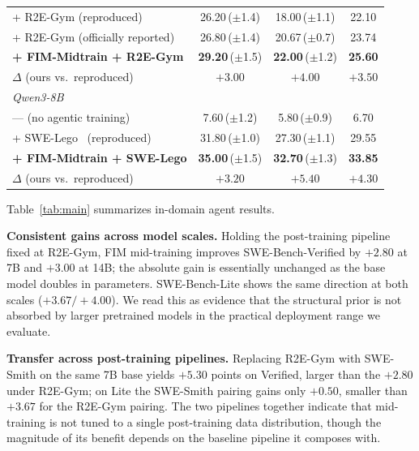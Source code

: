 \begin{table}[t]
\begin{tabular}{lccc}
\quad + R2E-Gym (reproduced)                          & 26.20\,($\pm$1.4)          & 18.00\,($\pm$1.1)          & 22.10 \\
\quad + R2E-Gym (officially reported)                 & 26.80\,($\pm$1.4)          & 20.67\,($\pm$0.7)          & 23.74 \\
\quad \textbf{+ FIM-Midtrain + R2E-Gym}               & \textbf{29.20}\,($\pm$1.5) & \textbf{22.00}\,($\pm$1.2) & \textbf{25.60} \\
\rowcolor{blue!8}
\quad\quad $\Delta$ (ours vs.\ reproduced)            & $+3.00$                    & $+4.00$                    & $+3.50$ \\
\midrule
\multicolumn{4}{l}{\textit{Qwen3-8B}} \\
\quad --- (no agentic training)                       & 7.60\,($\pm$1.2)           & 5.80\,($\pm$0.9)           & 6.70 \\
\quad + SWE-Lego~\citep{swelego} (reproduced)         & 31.80\,($\pm$1.0)          & 27.30\,($\pm$1.1)          & 29.55 \\
\quad \textbf{+ FIM-Midtrain + SWE-Lego}              & \textbf{35.00}\,($\pm$1.5) & \textbf{32.70}\,($\pm$1.3) & \textbf{33.85} \\
\rowcolor{blue!8}
\quad\quad $\Delta$ (ours vs.\ reproduced)            & $+3.20$                    & $+5.40$                    & $+4.30$ \\
\bottomrule
\end{tabular}
\end{table}

Table~\ref{tab:main} summarizes in-domain agent results.

\textbf{Consistent gains across model scales.}
Holding the post-training pipeline fixed at R2E-Gym, FIM mid-training
improves SWE-Bench-Verified by $+2.80$ at 7B and $+3.00$ at 14B; the
absolute gain is essentially unchanged as the base model doubles in
parameters. SWE-Bench-Lite shows the same direction at both scales
($+3.67/+4.00$). We read this as evidence that the structural prior is
not absorbed by larger pretrained models in the practical deployment
range we evaluate.

\textbf{Transfer across post-training pipelines.}
Replacing R2E-Gym with SWE-Smith on the same 7B base yields $+5.30$
points on Verified, larger than the $+2.80$ under R2E-Gym; on Lite the
SWE-Smith pairing gains only $+0.50$, smaller than $+3.67$ for the
R2E-Gym pairing. The two pipelines together indicate that mid-training
is not tuned to a single post-training data distribution, though the
magnitude of its benefit depends on the baseline pipeline it composes
with.

